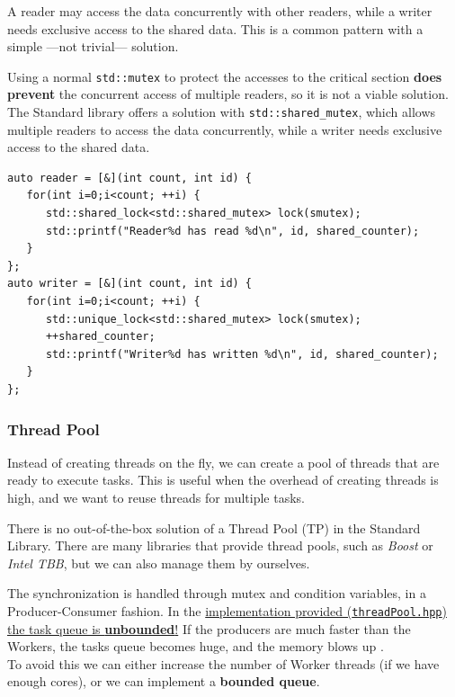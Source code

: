A reader may access the data concurrently with
other readers, while a writer needs exclusive access to the shared data.
This is a common pattern with a simple  ---not trivial--- solution.

\begin{paracol}{2}
   
   \colfill
   Using a normal \lstinline|std::mutex| to protect the accesses to the critical section \textbf{does prevent} the concurrent access of multiple readers, so it is not a viable solution.
   The Standard library offers a solution with \lstinline|std::shared_mutex|, which allows multiple readers to access the data concurrently, while a writer needs exclusive access to the shared data.
   \colfill
   
   \switchcolumn   
   
   \begin{lstlisting}[caption={spm3/reader-writer.cpp}]
auto reader = [&](int count, int id) {
   for(int i=0;i<count; ++i) {
      std::shared_lock<std::shared_mutex> lock(smutex);
      std::printf("Reader%d has read %d\n", id, shared_counter);
   }
};
auto writer = [&](int count, int id) {
   for(int i=0;i<count; ++i) {
      std::unique_lock<std::shared_mutex> lock(smutex);
      ++shared_counter;
      std::printf("Writer%d has written %d\n", id, shared_counter);
   }
};  
\end{lstlisting}
               
\end{paracol}

\subsubsection{Thread Pool}
Instead of creating threads on the fly, we can create a pool of threads that are ready to execute tasks. This is useful when the overhead of creating threads is high, and we want to reuse threads for multiple tasks.

There is no out-of-the-box solution of a Thread Pool (TP) in the Standard Library. There are many libraries that provide thread pools, such as \textit{Boost} or \textit{Intel TBB}, but we can also manage them by ourselves.

The synchronization is handled through mutex and condition variables, in a Producer-Consumer fashion.
In the \ul{implementation provided (\texttt{threadPool.hpp}) the task queue is \textbf{unbounded}!}
If the producers are much faster than the Workers, the tasks queue becomes huge, and the memory blows up \frownie.\\
To avoid this we can either increase the number of Worker threads (if we have enough cores), or we can implement a \textbf{bounded queue}.